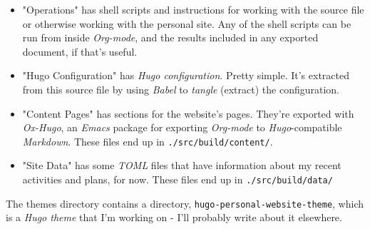 \documentclass[11pt]{article}
\begin{document}
\begin{itemize}
\item "Operations" has shell scripts and instructions for working with
the source file or otherwise working with the personal site. Any of
the shell scripts can be run from inside \emph{Org-mode}, and the results
included in any exported document, if that's useful.
\item "Hugo Configuration" has \emph{Hugo configuration}. Pretty simple. It's
extracted from this source file by using \emph{Babel} to \emph{tangle}
(extract) the configuration.
\item "Content Pages" has sections for the website's pages. They're
exported with \emph{Ox-Hugo}, an \emph{Emacs} package for exporting \emph{Org-mode}
to \emph{Hugo}-compatible \emph{Markdown}. These files end up in
\texttt{./src/build/content/}.
\item "Site Data" has some \emph{TOML} files that have information about my
recent activities and plans, for now. These files end up in
\texttt{./src/build/data/}
\end{itemize}

The themes directory contains a directory,
\texttt{hugo-personal-website-theme}, which is a \emph{Hugo theme} that I'm
working on - I'll probably write about it elsewhere.
\end{document}
